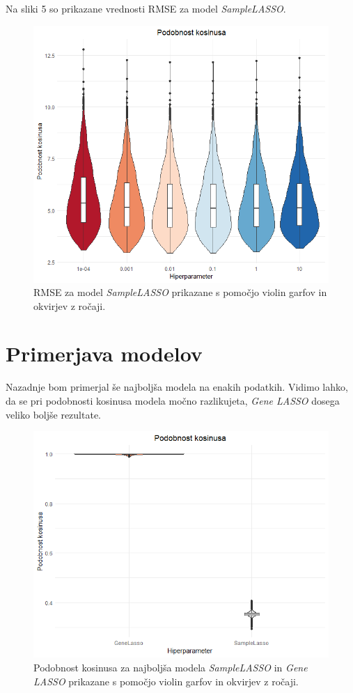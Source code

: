\documentclass[onecolumn]{report}
\begin{document}
Na sliki 5 so prikazane vrednosti RMSE za model \emph{SampleLASSO}.

\newpage

\begin{figure}[!htb]
	\centering
	\includegraphics[width=1\linewidth]{fig/rmse_sample.png}
	\caption{RMSE za model \emph{SampleLASSO} prikazane s pomočjo violin garfov in okvirjev z ročaji.}
	\label{fig:vqvae}
\end{figure}

\section*{Primerjava modelov}

Nazadnje bom primerjal še najboljša modela na enakih podatkih. Vidimo lahko, da se pri podobnosti kosinusa modela močno razlikujeta, \emph{Gene LASSO} dosega veliko boljše rezultate.

\begin{figure}[!htb]
	\centering
	\includegraphics[width=1.1\linewidth]{fig/best_cosine.png}
	\caption{Podobnost kosinusa za najboljša modela \emph{SampleLASSO} in \emph{Gene LASSO} prikazane s pomočjo violin garfov in okvirjev z ročaji.}
	\label{fig:vqvae}
\end{figure}
\end{document}
